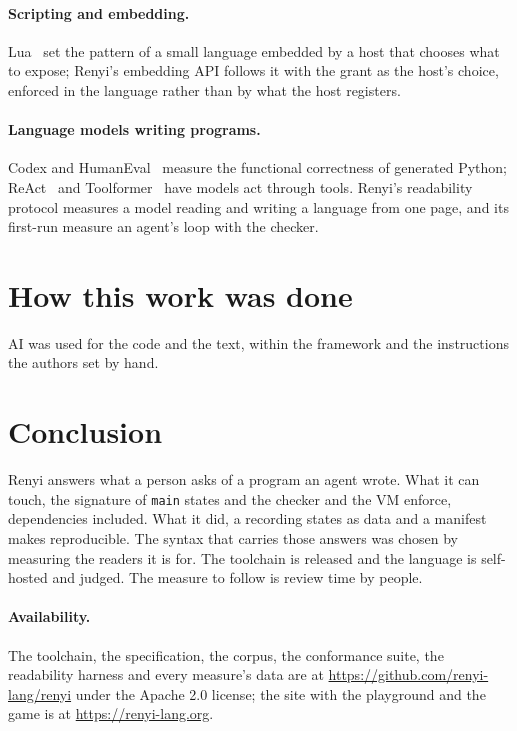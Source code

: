 \documentclass[11pt]{article}
\begin{document}
\paragraph{Scripting and embedding.} Lua~\citep{ierusalimschy1996lua}
set the pattern of a small language embedded by a host that chooses
what to expose; Renyi's embedding API follows it with the grant as the
host's choice, enforced in the language rather than by what the host
registers.

\paragraph{Language models writing programs.} Codex and
HumanEval~\citep{chen2021codex} measure the functional correctness of
generated Python; ReAct~\citep{yao2023react} and
Toolformer~\citep{schick2023toolformer} have models act through tools.
Renyi's readability protocol measures a model reading and writing a
language from one page, and its first-run measure an agent's loop with
the checker.

\section{How this work was done}

AI was used for the code and the text, within the framework and the
instructions the authors set by hand.

\section{Conclusion}

Renyi answers what a person asks of a program an agent wrote. What it
can touch, the signature of \texttt{main} states and the checker and
the VM enforce, dependencies included. What it did, a recording states
as data and a manifest makes reproducible. The syntax that carries
those answers was chosen by measuring the readers it is for. The
toolchain is released and the language is self-hosted and judged. The
measure to follow is review time by people.

\paragraph{Availability.} The toolchain, the specification, the corpus,
the conformance suite, the readability harness and every measure's data
are at \url{https://github.com/renyi-lang/renyi} under the Apache 2.0
license; the site with the playground and the game is at
\url{https://renyi-lang.org}.



\end{document}
